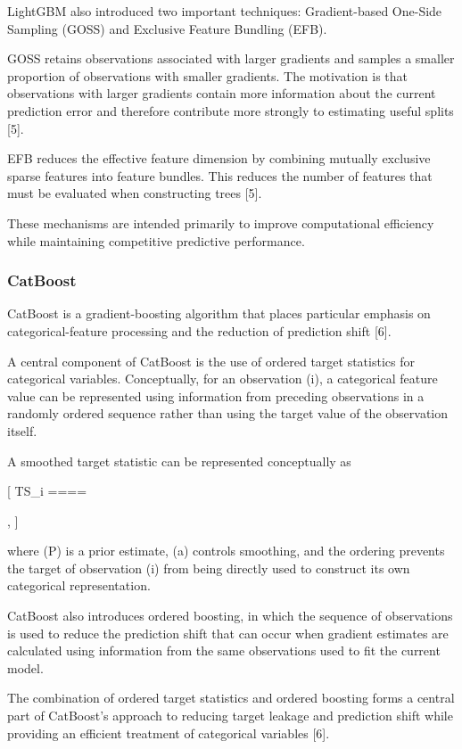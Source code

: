 LightGBM also introduced two important techniques: Gradient-based One-Side Sampling (GOSS) and Exclusive Feature Bundling (EFB).

GOSS retains observations associated with larger gradients and samples a smaller proportion of observations with smaller gradients. The motivation is that observations with larger gradients contain more information about the current prediction error and therefore contribute more strongly to estimating useful splits {[}5{]}.

EFB reduces the effective feature dimension by combining mutually exclusive sparse features into feature bundles. This reduces the number of features that must be evaluated when constructing trees {[}5{]}.

These mechanisms are intended primarily to improve computational efficiency while maintaining competitive predictive performance.

\subsubsection{CatBoost}\label{catboost}

CatBoost is a gradient-boosting algorithm that places particular emphasis on categorical-feature processing and the reduction of prediction shift {[}6{]}.

A central component of CatBoost is the use of ordered target statistics for categorical variables. Conceptually, for an observation (i), a categorical feature value can be represented using information from preceding observations in a randomly ordered sequence rather than using the target value of the observation itself.

A smoothed target statistic can be represented conceptually as

{[} TS\_i ====

, {]}

where (P) is a prior estimate, (a) controls smoothing, and the ordering prevents the target of observation (i) from being directly used to construct its own categorical representation.

CatBoost also introduces ordered boosting, in which the sequence of observations is used to reduce the prediction shift that can occur when gradient estimates are calculated using information from the same observations used to fit the current model.

The combination of ordered target statistics and ordered boosting forms a central part of CatBoost's approach to reducing target leakage and prediction shift while providing an efficient treatment of categorical variables {[}6{]}.

